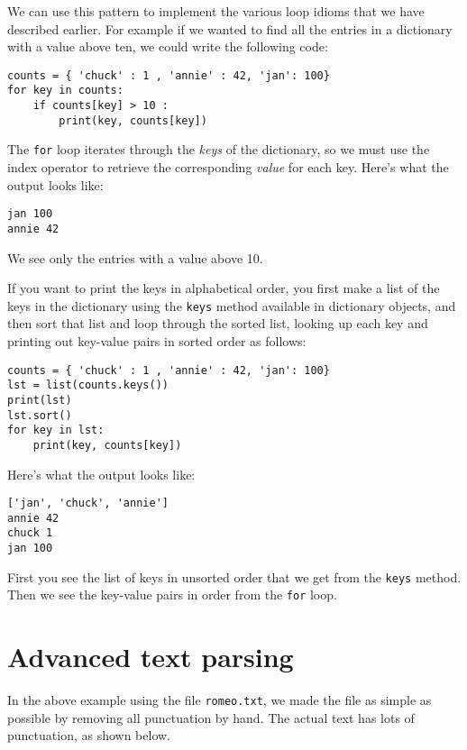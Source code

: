 We can use this pattern to implement the various loop idioms
that we have described earlier.  For example if we wanted 
to find all the entries in a dictionary with a value 
above ten, we could write the following code:

\beforeverb
\begin{verbatim}
counts = { 'chuck' : 1 , 'annie' : 42, 'jan': 100}
for key in counts:
    if counts[key] > 10 :
        print(key, counts[key])
\end{verbatim}
\afterverb
%
The {\tt for} loop iterates through the 
{\em keys} of the dictionary, so we must 
use the index operator to retrieve the 
corresponding {\em value}
for each key.
Here's what the output looks like:

\beforeverb
\begin{verbatim}
jan 100
annie 42
\end{verbatim}
\afterverb
%
We see only the entries with a value above 10.

If you want to print the keys in alphabetical order, you first 
make a list of the keys in the dictionary using the 
{\tt keys} method available in dictionary objects,
and then sort that list
and loop through the sorted list, looking up each
key and printing out key-value pairs in sorted order
as follows:

\beforeverb
\begin{verbatim}
counts = { 'chuck' : 1 , 'annie' : 42, 'jan': 100}
lst = list(counts.keys())
print(lst)
lst.sort()
for key in lst:
    print(key, counts[key])
\end{verbatim}
\afterverb
%
Here's what the output looks like:

\beforeverb
\begin{verbatim}
['jan', 'chuck', 'annie']
annie 42
chuck 1
jan 100
\end{verbatim}
\afterverb
%
First you see the list of keys in unsorted order that 
we get from the {\tt keys} method.  Then we see the key-value
pairs in order from the {\tt for} loop.

\section{Advanced text parsing}

In the above example using the file {\tt romeo.txt},
we made the file as simple as possible by removing 
all punctuation by hand.  The actual text 
has lots of punctuation, as shown below.

